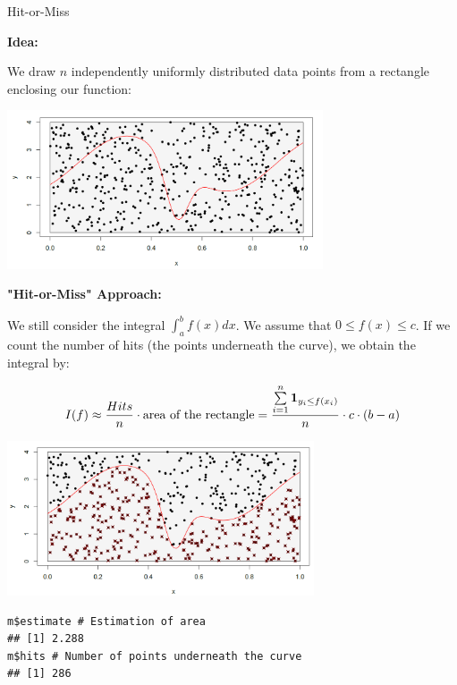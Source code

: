 \documentclass[11pt,compress,t,notes=noshow, xcolor=table]{beamer}
\begin{document}
\begin{vbframe}{Hit-or-Miss}

\textbf{Idea:}

We draw $n$ independently uniformly distributed data points from a rectangle enclosing our function:

\begin{center}
\includegraphics[width =0.7\textwidth]{figure_man/hitormiss.png}
\end{center}

\framebreak

\textbf{"Hit-or-Miss" Approach:}


We still consider the integral $\int_a^b f(x) dx$. We assume that $0 \le f(x) \le c$. If we count the number of hits (the points underneath the curve), we obtain the integral by:

$$
  I(f) \approx \frac{Hits}{n} \cdot \text{area of the rectangle} = \frac{\sum\limits_{i=1}^n \mathbf{1}_{y_i \le f(x_i)}}{n} \cdot c \cdot (b - a)
$$

\vspace*{-0.3cm}

\begin{center}
\includegraphics[width =0.68\textwidth]{figure_man/hitormiss2.png}
\end{center}


\framebreak


\footnotesize
\begin{verbatim}
m$estimate # Estimation of area
## [1] 2.288
m$hits # Number of points underneath the curve
## [1] 286
\end{verbatim}




\end{vbframe}
\end{document}
